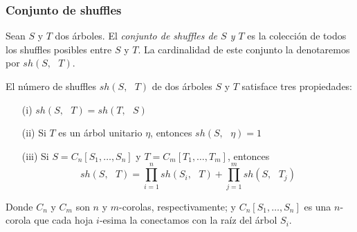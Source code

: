 \documentclass[../main.tex]{subfiles}
\begin{document}
\subsubsection{Conjunto de shuffles}
\begin{defi}
    Sean $S$ y $T$ dos \'arboles. El \emph{conjunto de shuffles de $S$ y $T$} es la colecci\'on de todos los shuffles posibles entre $S$ y $T$. La cardinalidad de este conjunto la denotaremos por $sh(S,\text{ }T)$.
\end{defi}
\begin{prop}
    El n\'umero de shuffles $sh(S,\text{ }T)$ de dos \'arboles $S$ y $T$ satisface tres propiedades:
    \begin{enumerate}
        \item[{\rm (i)}] $sh(S, \text{ }T) = sh(T, \text{ }S)$
        \item[{\rm (ii)}] Si $T$ es un \'arbol unitario $\eta$, entonces $sh(S, \text{ }\eta)=1$
        \item[{\rm (iii)}] Si $S=C_n[S_1,\dots,S_n]$ y $T=C_m[T_1,\dots,T_m]$, entonces
              $$
                  sh(S, \text{ }T)  = \prod_{i=1}^n sh(S_i, \text{ }T) + \prod_{j=1}^m sh(S, \text{ }T_j)
              $$
    \end{enumerate}
    Donde $C_n$ y $C_m$ son $n$ y $m$-corolas, respectivamente; y $C_n[S_1,\dots,S_n]$ es una $n$-corola que cada hoja $i$-esima la conectamos con la ra\'iz del \'arbol $S_i$.
\end{prop}
\end{document}
